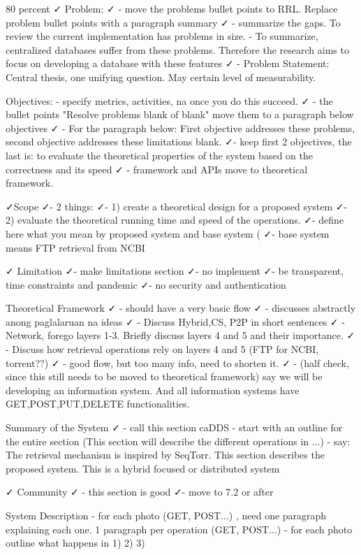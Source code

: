 80 percent ✓ Problem:
✓ - move the problems bullet points to RRL. Replace problem bullet points with a paragraph summary 
✓ - summarize the gaps. To review the current implementation has problems in size.
- To summarize, centralized databases suffer from these problems. Therefore the research aims to focus on developing a database with these features
✓ - Problem Statement: Central thesis, one unifying question. May certain level of measurability.

Objectives:
- specify metrics, activities, na once you do this succeed.
✓ - the bullet points "Resolve problems blank of blank" move them to a paragraph below objectives
✓ - For the paragraph below: First objective addresses these problems, second objective addresses these limitations blank.
✓- keep first 2 objectives, the last is: to evaluate the theoretical properties of the system based on the correctness and its speed
✓ - framework and APIs move to theoretical framework. 


✓Scope
✓- 2 things: 
✓- 1) create a theoretical design for a proposed system
✓- 2) evaluate the theoretical running time and speed of the operations.
✓- define here what you mean by proposed system and base system (
✓- base system means FTP retrieval from NCBI

✓ Limitation
✓- make limitations section
✓- no implement
✓- be transparent, time constraints and pandemic
✓- no security and authentication


Theoretical Framework
✓ - should have a very basic flow
✓ - discusses abstractly anong paglalaruan na ideas
✓ - Discuss Hybrid,CS, P2P in short sentences
✓ - Network, forego layers 1-3. Briefly discuss layers 4 and 5 and their importance.
✓ - Discuss how retrieval operations rely on layers 4 and 5 (FTP for NCBI, torrent??)
✓ - good flow, but too many info, need to shorten it.
✓ - (half check, since this still needs to be moved to theoretical framework) say we will be developing an information system. And all information systems have GET,POST,PUT,DELETE functionalities.


Summary of the System
✓ - call this section caDDS
- start with an outline for the entire section (This section will describe the different operations in ...)
- say: The retrieval mechanism is inspired by SeqTorr. This section describes the proposed system. This is a hybrid focused or distributed system

✓ Community
✓ - this section is good
✓- move to 7.2 or after

System Description
- for each photo (GET, POST...) , need one paragraph explaining each one. 1 paragraph per operation (GET, POST...)
- for each photo outline what happens in 1) 2) 3)


